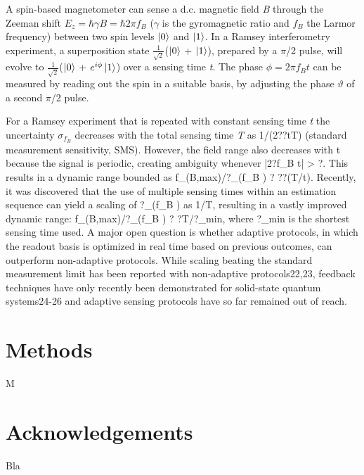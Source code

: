 A spin-based magnetometer can sense a d.c. magnetic field \textit{B} through the Zeeman shift $E_z=\hbar \gamma B = \hbar 2 \pi f_B$ ($\gamma$ is the gyromagnetic ratio and $f_B$ the Larmor frequency) between two spin levels $\left|0\right\rangle$ and $\left|1\right\rangle$. In a Ramsey interferometry experiment, a superposition state  $\frac{1}{\sqrt{2}}$($\left|0\right\rangle$ + $\left|1\right\rangle$), prepared by a $\pi$/2 pulse, will evolve to $\frac{1}{\sqrt{2}}$($\left|0\right\rangle$ + $e^{i\phi}\left|1\right\rangle$)   over a sensing time \textit{t}. The phase $\phi = 2 \pi f_B t$ can be measured by reading out the spin in a suitable basis, by adjusting the phase $\vartheta$ of a second $\pi$/2 pulse.


For a Ramsey experiment that is repeated with constant sensing time \textit{t} the uncertainty $\sigma_{f_B}$ decreases with the total sensing time \textit{T} as 1/(2??tT) (standard measurement sensitivity, SMS).  However, the field range also decreases with t because the signal is periodic, creating ambiguity whenever |2?f_B t| > ?. This results in a dynamic range bounded as  f_(B,max)/?_(f_B )  ? ??(T/t).  Recently, it was discovered that the use of multiple sensing times within an estimation sequence can yield a scaling of ?_(f_B ) as 1/T, resulting in a vastly improved dynamic range: f_(B,max)/?_(f_B )  ? ?T/?_min, where ?_min  is the shortest sensing time used. A major open question is whether adaptive protocols, in which the readout basis is optimized in real time based on previous outcomes, can outperform non-adaptive protocols. While scaling beating the standard measurement limit has been reported with non-adaptive protocols22,23, feedback techniques have only recently been demonstrated for solid-state quantum systems24-26 and adaptive sensing protocols have so far remained out of reach.

\section{Methods}
M
\section{Acknowledgements}
Bla

%
